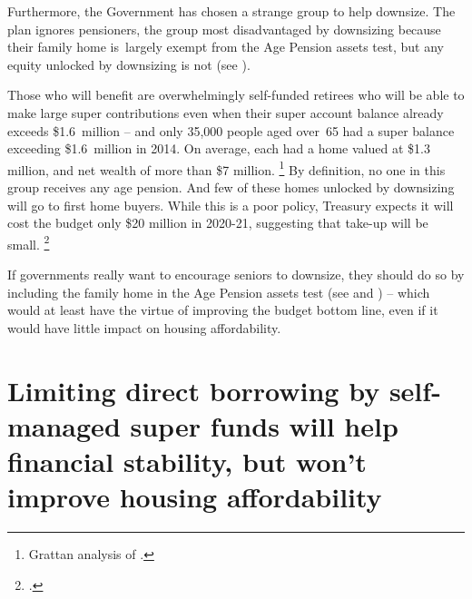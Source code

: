 Furthermore, the Government has chosen a strange group to help downsize.
The plan ignores pensioners, the group most disadvantaged by downsizing because their family home is~largely exempt from the Age Pension assets test, but any equity unlocked by downsizing is not (see ).

Those who will benefit are overwhelmingly self-funded retirees who will be able to make large super contributions even when their super account balance already exceeds \$1.6~million -- and only 35,000 people aged over~65 had a super balance exceeding \$1.6~million in 2014.
On average, each had a home valued at \$1.3 million, and net wealth of more than \$7 million.%
	\footnote{Grattan analysis of \textcite{ABS2015MicrodataIncomehousing}.}
By definition, no one in this group receives any age pension.
And few of these homes unlocked by downsizing will go to first home buyers.
While this is a poor policy, Treasury expects it will cost the budget only \$20 million in 2020-21, suggesting that take-up will be small.%
\footcite[][28]{Budget2017-18-BP2}

If governments really want to encourage seniors to downsize, they should do so by including the family home in the Age Pension assets test (see  and ) -- which would at least have the virtue of improving the budget bottom line, even if it would have little impact on housing affordability.

\section{Limiting direct borrowing by self-managed super funds will help financial stability, but won't improve housing affordability}\label{sec:restricting-smsf-borrowing}

